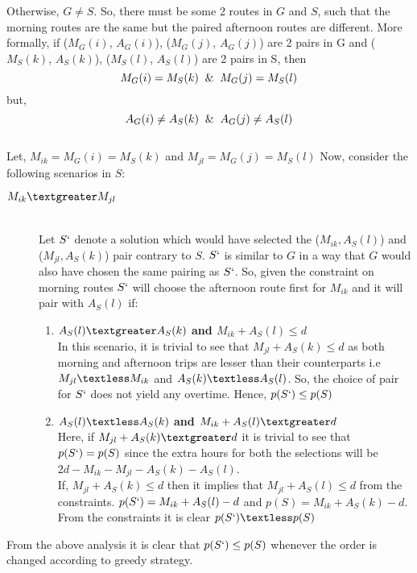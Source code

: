 \documentclass[8pt]{article}
\begin{document}
Otherwise, $G \neq S$. So, there must be some 2 routes in $G$ and $S$, such that the morning routes are the same but the paired afternoon routes are different. More formally, if ($M_G(i)$, $A_G(i)$), ($M_G(j)$, $A_G(j)$) are 2 pairs in G and ($M_S(k)$, $A_S(k)$), ($M_S(l)$, $A_S(l)$) are 2 pairs in S, then
$$M_G(i) = M_S(k) \And M_G(j) = M_S(l)$$
but,
$$A_G(i) \neq A_S(k) \And A_G(j) \neq A_S(l)$$ \\
Let, $M_{ik} = M_G(i) = M_S(k)$ and $M_{jl} = M_G(j) = M_S(l)$
Now, consider the following scenarios in $S$:
\begin{description}
    \item[$M_{ik} \textgreater M_{jl}$] \hfill \\
        Let $S`$ denote a solution which would have selected the ($M_{ik}, A_S(l)$) and ($M_{jl}, A_S(k)$) pair contrary to $S$. $S`$ is similar to $G$ in a way that $G$ would also have chosen the same pairing as $S`$. So, given the constraint on morning routes $S`$ will choose the afternoon route first for $M_{ik}$ and it will pair with $A_S(l)$ if:

    \begin{enumerate}
        \item \textbf{$A_S(l) \textgreater A_S(k)$ and $M_{ik} + A_S(l) \leq d$} \hfill \\
            In this scenario, it is trivial to see that $M_{jl} + A_S(k) \leq d$ as both morning and afternoon trips are lesser than their counterparts i.e $M_{jl} \textless M_{ik}$ and $A_S(k) \textless A_S(l)$. So, the choice of pair for $S`$ does not yield any overtime. Hence, $p(S`) \leq p(S)$

        \item \textbf{$A_S(l) \textless A_S(k)$ and $M_{ik} + A_S(l) \textgreater d$} \hfill \\
            Here, if $M_{jl} + A_S(k) \textgreater d$ it is trivial to see that $p(S`) = p(S)$ since the extra hours for both the selections will be $2d - M_{ik} - M_{jl} - A_S(k) - A_S(l)$. \\
            If, $M_{jl} + A_S(k) \leq d$ then it implies that $M_{jl} + A_S(l) \leq d$ from the constraints. $p(S`) =  M_{ik} + A_S(l) - d$ and $p(S) = M_{ik} + A_S(k) - d$. From the constraints it is clear $p(S`) \textless p(S)$
    \end{enumerate}
\end{description}

From the above analysis it is clear that $p(S`) \leq p(S)$ whenever the order is changed according to greedy strategy.
\end{document}
